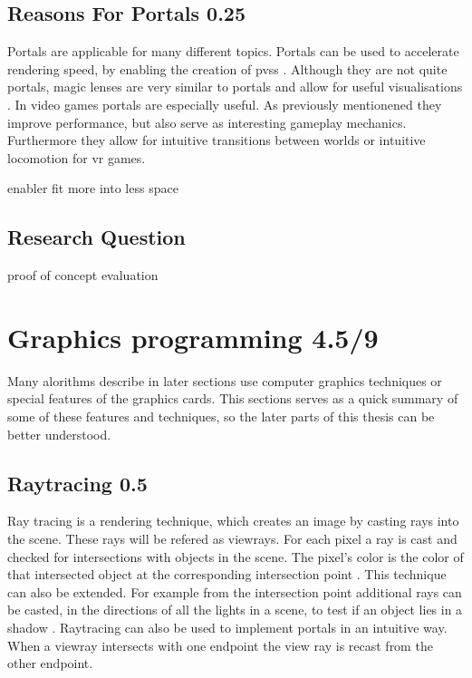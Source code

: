 \subsection{Reasons For Portals 0.25}
Portals are applicable for many different topics. Portals can be used to accelerate rendering speed, by enabling the creation of \glspl{pvs} \cite{luebke:1995:portals}. Although they are not quite portals, magic lenses are very similar to portals and allow for useful visualisations \cite{viega:1996:3d}. In video games portals are especially useful. As previously mentionened they improve performance, but also serve as interesting gameplay mechanics. Furthermore they allow for intuitive transitions between worlds \cite{schmalstieg:1999:sewing} or intuitive locomotion for \gls{vr} games.


enabler fit more into less space

\subsection{Research Question}
proof of concept
evaluation



\section{Graphics programming 4.5/9}


Many alorithms describe in later sections use computer graphics techniques or special features of the graphics cards. This sections serves as a quick summary of some of these features and techniques, so the later parts of this thesis can be better understood. 


\subsection{Raytracing 0.5}
Ray tracing is a rendering technique, which creates an image by casting rays into the scene. These rays will be refered as \glspl{viewray}. For each pixel a ray is cast and checked for intersections with objects in the scene. The pixel's color is the color of that intersected object at the corresponding intersection point \cite{bungartz:2002:einfuhrung}. This technique can also be extended. For example from the intersection point additional rays can be casted, in the directions of all the lights in a scene, to test if an object lies in a shadow \cite{whitted:2005:improved}. Raytracing can also be used to implement portals in an intuitive way. When a \gls{viewray} intersects with one \gls{endpoint} the view ray is recast from the other \gls{endpoint}.

